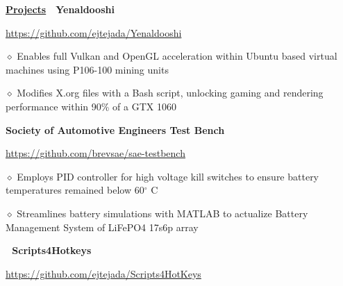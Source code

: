 \documentclass [11pt]{article}
\begin{document}
\begin{flushleft}
\underline{\textbf{Projects}}
\linebreak
%
‭‭%
%
‭‭%
\textbf{Yenaldooshi}\begin{minipage}{0.89 \linewidth}\begin{flushright}\href{https://github.com/ejtejada/Yenaldooshi}{https://github.com/ejtejada/Yenaldooshi}\end{flushright}\end{minipage}

‭‭\quad\quad\quad$\diamond$ Enables full Vulkan and OpenGL acceleration within Ubuntu based virtual machines using P106-100 mining units

‭‭\quad\quad\quad$\diamond$ Modifies X.org files with a Bash script, unlocking gaming and rendering performance within 90\% of a GTX 1060

\textbf{Society of Automotive Engineers Test Bench}\begin{minipage}{0.62 \linewidth}\begin{flushright}\href{https://github.com/brevsae/sae-testbench}{https://github.com/brevsae/sae-testbench}\end{flushright}\end{minipage}

\quad\quad\quad$\diamond$ Employs PID controller for high voltage kill switches to ensure battery temperatures remained below 60$^{\circ}$ C

‭‭\quad\quad\quad$\diamond$ Streamlines battery simulations with MATLAB to actualize Battery Management System of LiFePO4 17s6p array

%
‭‭%
%
‭‭%
\textbf{Scripts4Hotkeys}\begin{minipage}{0.86 \linewidth}\begin{flushright}\href{https://github.com/ejtejada/Scripts4HotKeys}{https://github.com/ejtejada/Scripts4HotKeys}\end{flushright}\end{minipage}


\end{flushleft}
\end{document}
